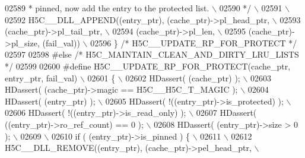 \begin{DoxyCode}
02589 \textcolor{comment}{     * pinned, now add the entry to the protected list.                   \(\backslash\)}
02590 \textcolor{comment}{     */}\textcolor{preprocessor}{                                                                   \(\backslash\)}
02591 \textcolor{preprocessor}{                                                                          \(\backslash\)}
02592 \textcolor{preprocessor}{    H5C\_\_DLL\_APPEND((entry\_ptr), (cache\_ptr)->pl\_head\_ptr,                \(\backslash\)}
02593 \textcolor{preprocessor}{                    (cache\_ptr)->pl\_tail\_ptr,                             \(\backslash\)}
02594 \textcolor{preprocessor}{                    (cache\_ptr)->pl\_len,                                  \(\backslash\)}
02595 \textcolor{preprocessor}{                    (cache\_ptr)->pl\_size, (fail\_val))                     \(\backslash\)}
02596 \textcolor{preprocessor}{\} }\textcolor{comment}{/* H5C\_\_UPDATE\_RP\_FOR\_PROTECT */}\textcolor{preprocessor}{}
02597 
02598 \textcolor{preprocessor}{#else }\textcolor{comment}{/* H5C\_MAINTAIN\_CLEAN\_AND\_DIRTY\_LRU\_LISTS */}\textcolor{preprocessor}{}
02599 
02600 \textcolor{preprocessor}{#define H5C\_\_UPDATE\_RP\_FOR\_PROTECT(cache\_ptr, entry\_ptr, fail\_val)        \(\backslash\)}
02601 \textcolor{preprocessor}{\{                                                                         \(\backslash\)}
02602 \textcolor{preprocessor}{    HDassert( (cache\_ptr) );                                              \(\backslash\)}
02603 \textcolor{preprocessor}{    HDassert( (cache\_ptr)->magic == H5C\_\_H5C\_T\_MAGIC );                   \(\backslash\)}
02604 \textcolor{preprocessor}{    HDassert( (entry\_ptr) );                                              \(\backslash\)}
02605 \textcolor{preprocessor}{    HDassert( !((entry\_ptr)->is\_protected) );                             \(\backslash\)}
02606 \textcolor{preprocessor}{    HDassert( !((entry\_ptr)->is\_read\_only) );                             \(\backslash\)}
02607 \textcolor{preprocessor}{    HDassert( ((entry\_ptr)->ro\_ref\_count) == 0 );                         \(\backslash\)}
02608 \textcolor{preprocessor}{    HDassert( (entry\_ptr)->size > 0 );                                    \(\backslash\)}
02609 \textcolor{preprocessor}{                                      \(\backslash\)}
02610 \textcolor{preprocessor}{    if ( (entry\_ptr)->is\_pinned ) \{                                       \(\backslash\)}
02611 \textcolor{preprocessor}{                                                                          \(\backslash\)}
02612 \textcolor{preprocessor}{        H5C\_\_DLL\_REMOVE((entry\_ptr), (cache\_ptr)->pel\_head\_ptr,           \(\backslash\)}

\end{DoxyCode}
